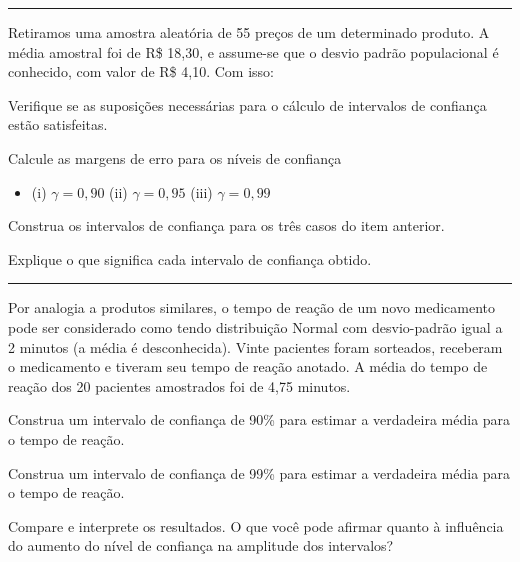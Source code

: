 \documentclass[a4paper,11pt,fleqn]{article}\usepackage[]{graphicx}\usepackage[]{color}
\theoremstyle{definition}
\begin{document}
\vspace{0.3cm}
\hrule
\vspace{0.3cm}

\begin{compactenum}[4.]
\item Retiramos uma amostra aleatória de 55 preços de um determinado
  produto. A média amostral foi de R\$ 18,30, e assume-se que o desvio
  padrão populacional é conhecido, com valor de R\$ 4,10. Com isso:
  \begin{compactenum}
  \item Verifique se as suposições necessárias para o cálculo de
    intervalos de confiança estão satisfeitas.
  \item Calcule as margens de erro para os níveis de confiança
    \begin{itemize}
    \item[] (i) $\gamma = 0,90$ \quad (ii) $\gamma = 0,95$ \quad
      (iii) $\gamma = 0,99$
    \end{itemize}
  \item Construa os intervalos de confiança para os três casos do item
    anterior.
  \item Explique o que significa cada intervalo de confiança obtido.
  \end{compactenum}
\end{compactenum}

\vspace{0.3cm}
\hrule
\vspace{0.3cm}

\begin{compactenum}[5.] %

\item Por analogia a produtos similares, o tempo de reação de um novo
  medicamento pode ser considerado como tendo distribuição Normal com
  desvio-padrão igual a 2 minutos (a média é desconhecida). Vinte
  pacientes foram sorteados, receberam o medicamento e tiveram seu tempo
  de reação anotado. A média do tempo de reação dos 20 pacientes
  amostrados foi de 4,75 minutos.
  \begin{compactenum}
  \item Construa um intervalo de confiança de 90\% para estimar a
    verdadeira média para o tempo de reação.
  \item Construa um intervalo de confiança de 99\% para estimar a
    verdadeira média para o tempo de reação.
  \item Compare e interprete os resultados. O que você pode afirmar
    quanto à influência do aumento do nível de confiança na amplitude
    dos intervalos?
  \end{compactenum}
\end{compactenum}
\end{document}
